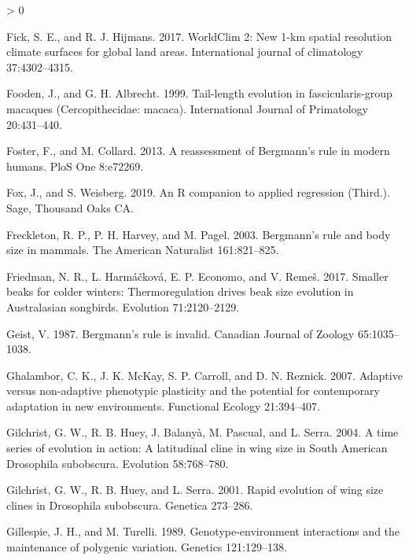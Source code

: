 \documentclass[
]{article}
\newlength{\cslhangindent}
\newenvironment{CSLReferences}[2] %
 {%
  \setlength{\parindent}{0pt}
  \ifodd #1 \everypar{\setlength{\hangindent}{\cslhangindent}}\ignorespaces\fi
  \ifnum #2 > 0
  \setlength{\parskip}{#2\baselineskip}
  \fi
 }%
 {}
\begin{document}
\begin{CSLReferences}{0}{0}
\leavevmode\hypertarget{ref-Fick2017}{}%
Fick, S. E., and R. J. Hijmans. 2017. WorldClim 2: New 1-km spatial
resolution climate surfaces for global land areas. International journal
of climatology 37:4302--4315.

\leavevmode\hypertarget{ref-Fooden1999}{}%
Fooden, J., and G. H. Albrecht. 1999. Tail-length evolution in
fascicularis-group macaques ({Cercopithecidae}: macaca). International
Journal of Primatology 20:431--440.

\leavevmode\hypertarget{ref-Foster2013}{}%
Foster, F., and M. Collard. 2013. A reassessment of {Bergmann's} rule in
modern humans. PloS One 8:e72269.

\leavevmode\hypertarget{ref-Fox2019}{}%
Fox, J., and S. Weisberg. 2019. An {R} companion to applied regression
(Third.). Sage, Thousand Oaks {CA}.

\leavevmode\hypertarget{ref-Freckleton2003}{}%
Freckleton, R. P., P. H. Harvey, and M. Pagel. 2003. Bergmann's rule and
body size in mammals. The American Naturalist 161:821--825.

\leavevmode\hypertarget{ref-Friedman2017}{}%
Friedman, N. R., L. Harmáčková, E. P. Economo, and V. Remeš. 2017.
Smaller beaks for colder winters: Thermoregulation drives beak size
evolution in {Australasian} songbirds. Evolution 71:2120--2129.

\leavevmode\hypertarget{ref-Geist1987}{}%
Geist, V. 1987. Bergmann's rule is invalid. Canadian Journal of Zoology
65:1035--1038.

\leavevmode\hypertarget{ref-Ghalambor2007}{}%
Ghalambor, C. K., J. K. McKay, S. P. Carroll, and D. N. Reznick. 2007.
Adaptive versus non-adaptive phenotypic plasticity and the potential for
contemporary adaptation in new environments. Functional Ecology
21:394--407.

\leavevmode\hypertarget{ref-Gilchrist2004a}{}%
Gilchrist, G. W., R. B. Huey, J. Balanyà, M. Pascual, and L. Serra.
2004. A time series of evolution in action: A latitudinal cline in wing
size in {South} {American} {Drosophila} subobscura. Evolution
58:768--780.

\leavevmode\hypertarget{ref-Gilchrist2001}{}%
Gilchrist, G. W., R. B. Huey, and L. Serra. 2001. Rapid evolution of
wing size clines in {Drosophila} subobscura. Genetica 273--286.

\leavevmode\hypertarget{ref-Gillespie1989}{}%
Gillespie, J. H., and M. Turelli. 1989. Genotype-environment
interactions and the maintenance of polygenic variation. Genetics
121:129--138.


\end{CSLReferences}
\end{document}
